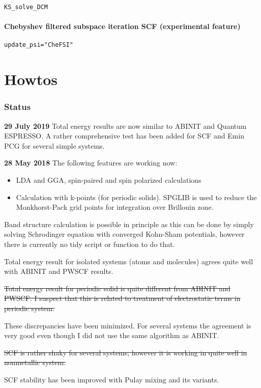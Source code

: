 \documentclass[a4paper,12pt]{article}
\newcommand{\jlcode}[1]{\texttt{#1}}
\begin{document}
\jlcode{KS_solve_DCM}

\subsection{Chebyshev filtered subspace iteration SCF (experimental feature)}

\jlcode{update_psi="CheFSI"}


\part{Howtos}



\section*{Status}

\textbf{29 July 2019} Total energy results are now similar to ABINIT
and Quantum ESPRESSO. A rather comprehensive test has been added
for SCF and Emin PCG for several simple systems.


\textbf{28 May 2018} The following features are working now:
\begin{itemize}
\item LDA and GGA, spin-paired and spin polarized calculations
\item Calculation with k-points (for periodic solids).
  \textsf{SPGLIB} is used to reduce the Monkhorst-Pack grid points
  for integration over Brillouin zone.
\end{itemize}

Band structure calculation is possible in principle as this can be
done by simply solving
Schrodinger equation with converged Kohn-Sham potentials, however there
is currently no tidy script or function to do that.

Total energy result for isolated systems (atoms and molecules) agrees quite
well with ABINIT and PWSCF results.

\sout{Total energy result for periodic solid is quite different from ABINIT and PWSCF.
I suspect that this is related to treatment of electrostatic terms in periodic system.}

These discrepancies have been minimized. For several systems the agreement is very good
even though I did not use the same algorithm as ABINIT.

\sout{SCF is rather shaky for several systems, however it is working in quite well in nonmetallic
system.}

SCF stability has been improved with Pulay mixing and its variants.
\end{document}

